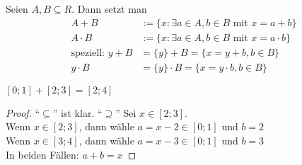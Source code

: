 \documentclass[12pt]{scrreprt}
\begin{document}
\begin{dfn*}
Seien $A,B \subseteq R$. Dann setzt man 
\begin{align*}
A + B &:= \{x:\exists a \in A, b\in B\text{ mit }x=a+b\}\\
A \cdot B &:= \{x:\exists a \in A, b\in B\text{ mit }x=a\cdot b\}\\
\text{speziell: }y+B&=\{y\}+B = \{x=y+b, b\in B\}\\
y\cdot B&=\{y\}\cdot B = \{x=y\cdot b, b\in B\}
\end{align*}
\end{dfn*}

\begin{bsp*}
$[0;1]+[2;3]=[2;4]$
\end{bsp*}
\begin{proof}
"`$\subseteq$"' ist klar.
"`$\supseteq$"' Sei $x \in [2;3]$.\\
Wenn $x \in [2;3]$, dann wähle $a=x-2\in[0;1]$ und $b=2$\\
Wenn $x \in [3;4]$, dann wähle $a=x-3\in[0;1]$ und $b=3$\\
In beiden Fällen: $a+b=x$
\end{proof}
\end{document}
